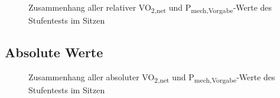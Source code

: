 \documentclass[
  letterpaper,
  DIV=11]{scrartcl}
\begin{document}
\begin{figure}


\caption{\label{fig-ST_O2cost_rel}Zusammenhang aller relativer
VO\textsubscript{2,net} und P\textsubscript{mech,Vorgabe}-Werte des
Stufentests im Sitzen}

\end{figure}%

\subsection{Absolute Werte}

\begin{figure}


\caption{\label{fig-ST_O2cost_abs}Zusammenhang aller absoluter
VO\textsubscript{2,net} und P\textsubscript{mech,Vorgabe}-Werte des
Stufentests im Sitzen}

\end{figure}%
\end{document}
